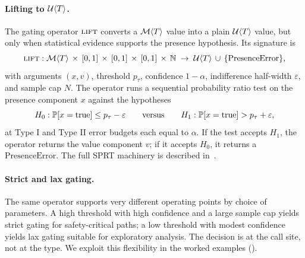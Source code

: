\paragraph{Lifting to $\mathcal{U}\langle T \rangle$.} The gating operator
$\textsc{lift}$ converts a $\mathcal{M}\langle T \rangle$ value into a plain
$\mathcal{U}\langle T \rangle$ value, but only when statistical evidence
supports the presence hypothesis. Its signature is
\begin{equation*}
\textsc{lift} : \mathcal{M}\langle T \rangle \,\times\, [0,1] \,\times\, [0,1] \,\times\, [0,1] \,\times\, \mathbb{N} \;\to\; \mathcal{U}\langle T \rangle \,\cup\, \{\mathrm{PresenceError}\},
\end{equation*}
with arguments $(x, v)$, threshold $p_\tau$, confidence $1 - \alpha$,
indifference half-width $\varepsilon$, and sample cap $N$. The operator
runs a sequential probability ratio test on the presence component $x$
against the hypotheses
\begin{equation*}
H_0 : \mathbb{P}[x = \text{true}] \le p_\tau - \varepsilon
\qquad\text{versus}\qquad
H_1 : \mathbb{P}[x = \text{true}] > p_\tau + \varepsilon,
\end{equation*}
at Type I and Type II error budgets each equal to $\alpha$. If the test
accepts $H_1$, the operator returns the value component $v$; if it accepts
$H_0$, it returns a $\mathrm{PresenceError}$. The full SPRT machinery is
described in~.

\paragraph{Strict and lax gating.} The same operator supports very different
operating points by choice of parameters. A high threshold with high
confidence and a large sample cap yields strict gating for safety-critical
paths; a low threshold with modest confidence yields lax gating suitable
for exploratory analysis. The decision is at the call site, not at the
type. We exploit this flexibility in the worked examples
().
